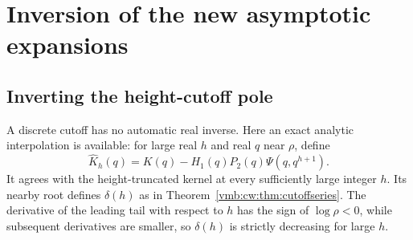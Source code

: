 \documentclass[11pt,a4paper]{article}
\numberwithin{equation}{section}
\theoremstyle{definition}\newtheorem{definition}[theorem]{Definition}
\theoremstyle{remark}\newtheorem{remark}[theorem]{Remark}
\begin{document}
\section{Inversion of the new asymptotic expansions}
\label{vmb:cw:sec:inversion}

\subsection{Inverting the height-cutoff pole}\label{vmb:cw:sec:inverseheight}
A discrete cutoff has no automatic real inverse. Here an exact analytic
interpolation is available: for large real $h$ and real $q$ near $\rho$,
define
\begin{equation}\label{vmb:cw:eq:heightinterp}
 \widehat K_h(q)=K(q)-H_1(q)P_2(q)\Psi(q,q^{h+1}).
\end{equation}
It agrees with the height-truncated kernel at every sufficiently large
integer $h$. Its nearby root defines $\delta(h)$ as in
Theorem~\ref{vmb:cw:thm:cutoffseries}. The derivative of the leading tail with
respect to $h$ has the sign of $\log\rho<0$, while subsequent derivatives
are smaller, so $\delta(h)$ is strictly decreasing for large $h$.
\end{document}
